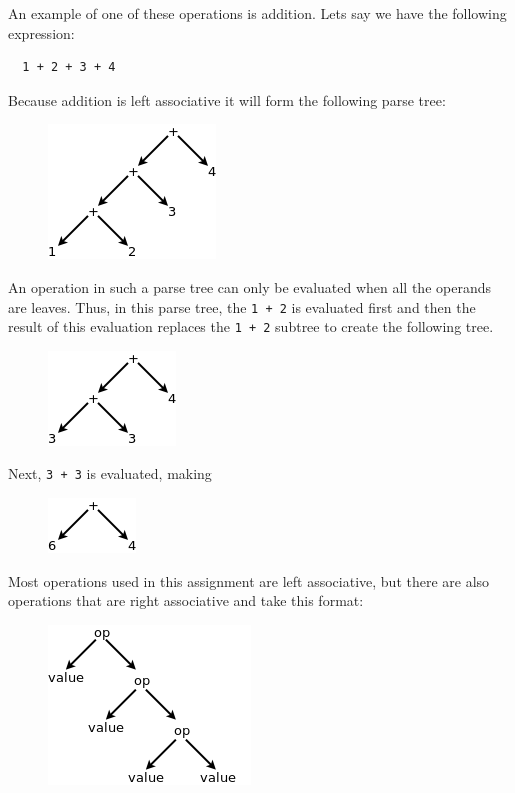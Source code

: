 \documentclass{article}
\newcommand{\code}[1]{\texttt{\textmd{#1}}}
\begin{document}
An example of one of these operations is addition. Lets say we have the following expression:
\begin{lstlisting}
  1 + 2 + 3 + 4
\end{lstlisting}

Because addition is left associative it will form the following parse tree:
\begin{figure}[H]
  \centering
  \includegraphics{static/left-assoc-plus.png}
\end{figure}

An operation in such a parse tree can only be evaluated when all the operands are leaves. Thus, in
this parse tree, the \code{1 + 2} is evaluated first and then the result of this evaluation
replaces the \code{1 + 2} subtree to create the following tree.
\begin{figure}[H]
  \centering
  \includegraphics{static/left-assoc-plus-2.png}
\end{figure}

Next, \code{3 + 3} is evaluated, making
\begin{figure}[H]
  \centering
  \includegraphics{static/left-assoc-plus-3.png}
\end{figure}

Most operations used in this assignment are left associative, but there are also operations that
are right associative and take this format:
\begin{figure}[H]
  \centering
  \includegraphics{static/right-assoc-gen.png}
\end{figure}
\end{document}

